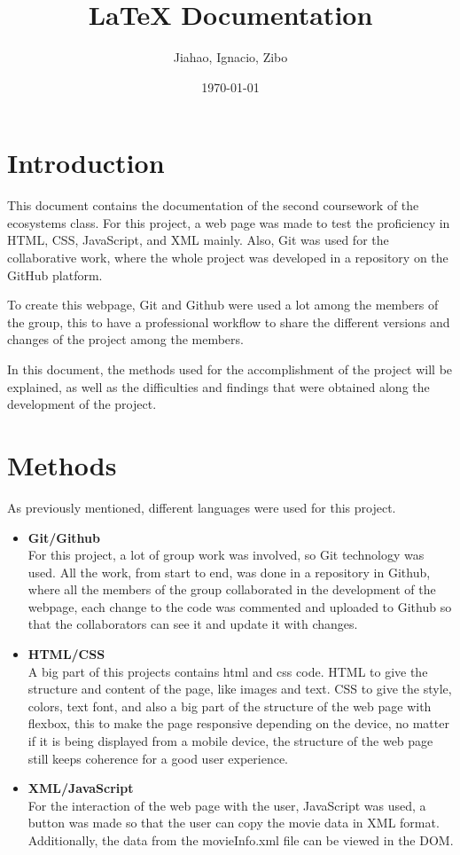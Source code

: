 \documentclass{article}
\title{LaTeX Documentation}
\author{Jiahao, Ignacio, Zibo}
\date{\today}
\begin{document}
\maketitle
\newpage

\section{Introduction}

This document contains the documentation of the second coursework of the ecosystems class. For this project, a web page was made to test the proficiency in HTML, CSS, JavaScript, and XML mainly. Also, Git was used for the collaborative work, where the whole project was developed in a repository on the GitHub platform.

To create this webpage, Git and Github were used a lot among the members of the group, this to have a professional workflow to share the different versions and changes of the project among the members.

In this document, the methods used for the accomplishment of the project will be explained, as well as the difficulties and findings that were obtained along the development of the project.

\section{Methods}

As previously mentioned, different languages were used for this project.

\begin{itemize}
  \item \textbf{Git/Github} \\
  For this project, a lot of group work was involved, so Git technology was used. All the work, from start to end, was done in a repository in Github, where all the members of the group collaborated in the development of the webpage, each change to the code was commented and uploaded to Github so that the collaborators can see it and update it with changes.

  \item \textbf{HTML/CSS} \\
  A big part of this projects contains html and css code. HTML to give the structure and content of the page, like images and text. CSS to give the style, colors, text font, and also a big part of the structure of the web page with flexbox, this to make the page responsive depending on the device, no matter if it is being displayed from a mobile device, the structure of the web page still keeps coherence for a good user experience.

  \item \textbf{XML/JavaScript} \\
  For the interaction of the web page with the user, JavaScript was used, a button was made so that the user can copy the movie data in XML format. Additionally, the data from the movieInfo.xml file can be viewed in the DOM.
\end{itemize}
\end{document}
